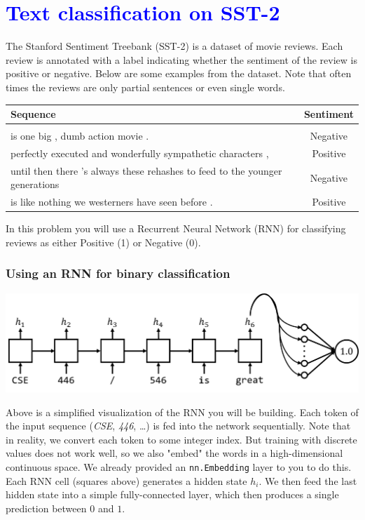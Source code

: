 \documentclass{article}
\begin{document}
\section*{\textcolor{blue}{Text classification on SST-2}}
\begin{bprob}
 The Stanford Sentiment Treebank (SST-2) is a dataset of movie reviews. Each review is annotated with a label indicating whether the sentiment of the review is
positive or negative.  Below are some examples from the dataset. Note that often times the reviews are only partial
sentences or even single words.

\begin{center}
\begin{tabular}{ l | c }
Sequence & Sentiment\\
\hline\\
is one big , dumb action movie . & Negative \\ 
perfectly executed and wonderfully sympathetic characters , & Positive \\
until then there 's always these rehashes to feed to the younger generations & Negative\\
is like nothing we westerners have seen before . & Positive
\end{tabular}
\end{center}

In this problem you will use a Recurrent Neural Network (RNN) for classifying reviews as either Positive (1) or Negative (0).

\subsubsection*{Using an RNN for binary classification}
\begin{center}
\includegraphics[scale=0.75]{rnn.png}
\end{center}

Above is a simplified visualization of the RNN you will be building. Each token of the input sequence (\textit{CSE}, \textit{446}, \dots) is 
fed into the network sequentially. Note that in reality, we convert each token to some integer index. But training with discrete values
does not work well, so we also "embed" the words in a high-dimensional continuous space. We already provided an \texttt{nn.Embedding} layer
to you to do this. Each RNN cell (squares above) generates a hidden state $h_i$. We then feed the last hidden state into a simple
fully-connected layer, which then produces a single prediction between $0$ and $1$.


\end{bprob}
\end{document}
